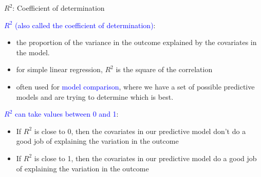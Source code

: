 \documentclass[10pt,t]{beamer}
\begin{document}
\begin{frame}{$R^2$: Coefficient of determination}

\vspace{-5 mm}

\textcolor{blue}{$R^2$ (also called the coefficient of determination)}: 
\medskip
\begin{itemize}
\item the proportion of the variance in the outcome explained by the covariates in the model. 
\medskip
\item for simple linear regression, $R^2$ is the square of the correlation
\medskip

\item  often used for \textcolor{blue}{model comparison}, where we have a set of possible predictive models and are trying to determine which is best.
\end{itemize}

\vspace{0.3cm}

\textcolor{blue}{$R^2$ can take values between 0 and 1}:

\vspace{0.3cm}

\begin{itemize}
	\item If $R^2$ is close to 0, then the covariates in our predictive model don't do a good job of explaining the variation in the outcome
	
	\medskip
	
	\item If $R^2$ is close to 1, then the covariates in our predictive model do a good job of explaining the variation in the outcome
\end{itemize}


\end{frame}
\end{document}
